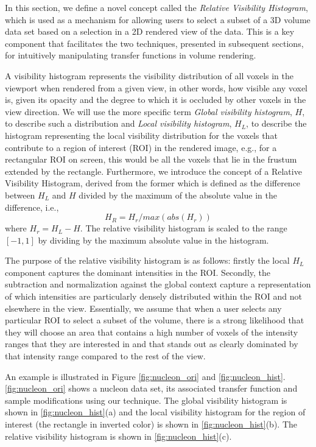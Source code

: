 \documentclass[twoside,twocolumn,10pt]{article}
\begin{document}
In this section, we define a novel concept called the \emph{Relative Visibility Histogram}, which is used as a mechanism for allowing users to select a subset of a 3D volume data set based on a selection in a 2D rendered view of the data. This is a key component that facilitates the two techniques, presented in subsequent sections, for intuitively manipulating transfer functions in volume rendering.

A visibility histogram \cite{correa_visibility_2011} represents the visibility distribution of all voxels in the viewport when rendered from a given view, in other words, how visible any voxel is, given its opacity and the degree to which it is occluded by other voxels in the view direction. We will use the more specific term \emph{Global visibility histogram}, $ H $, to describe such a distribution and  \emph{Local visibility histogram}, $ H_{L} $,  to describe the histogram representing the local visibility distribution for the voxels that contribute to a region of interest (ROI) in the rendered image, e.g., for a rectangular ROI on screen, this would be all the voxels that lie in the frustum extended by the rectangle. Furthermore, we introduce the concept of a Relative Visibility Histogram, derived from the former which is defined as the difference between $ H_{L} $ and $ H $ divided by the maximum of the absolute value in the difference, i.e.,
\[
H_{R}=H_{r}/max(abs(H_{r}))
\]
where $ H_{r}=H_{L}-H$.
The relative visibility histogram is scaled to the range $ [-1,1] $ by dividing by the maximum absolute value in the histogram. 

The purpose of the relative visibility histogram is as follows: firstly the local $ H_L $ component captures the dominant intensities in the ROI. Secondly, the subtraction and normalization against the global context capture a representation of which intensities are particularly densely distributed within the ROI and not elsewhere in the view. Essentially, we assume that when a user selects any particular ROI to select a subset of the volume, there is a strong likelihood that they will choose an area that contains a high number of voxels of the intensity ranges that they are interested in and that stands out as clearly dominated by that intensity range compared to the rest of the view. 


An example is illustrated in Figure \ref{fig:nucleon_ori} and \ref{fig:nucleon_hist}.
\autoref{fig:nucleon_ori} shows a nucleon data set, its associated transfer function and sample modifications using our technique.
The global visibility histogram is shown in 
\autoref{fig:nucleon_hist}(a) and the local visibility histogram for the region of interest (the rectangle in inverted color) is shown in \autoref{fig:nucleon_hist}(b). The relative visibility histogram
is shown in \autoref{fig:nucleon_hist}(c).
\end{document}

